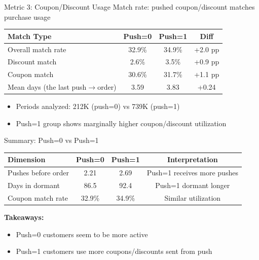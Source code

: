 \documentclass[aspectratio=169]{beamer}  %
\begin{document}
\begin{frame}{Metric 3: Coupon/Discount Usage}
Match rate: pushed coupon/discount matches purchase usage
\vspace{0.2cm}

\begin{table}
\centering
\small
\begin{tabular}{lccc}
\toprule
\textbf{Match Type} & \textbf{Push=0} & \textbf{Push=1} & \textbf{Diff} \\
\midrule
Overall match rate & 32.9\% & 34.9\% & +2.0 pp \\
Discount match & 2.6\% & 3.5\% & +0.9 pp \\
Coupon match & 30.6\% & 31.7\% & +1.1 pp \\
Mean days (the last push$\to$order) & 3.59 & 3.83 & +0.24 \\
\bottomrule
\end{tabular}
\end{table}

\begin{itemize}
    \item Periods analyzed: 212K (push=0) vs 739K (push=1)
    \item Push=1 group shows marginally higher coupon/discount utilization
\end{itemize}
\end{frame}

\begin{frame}{Summary: Push=0 vs Push=1}
\begin{table}
\centering
\small
\begin{tabular}{lccc}
\toprule
\textbf{Dimension} & \textbf{Push=0} & \textbf{Push=1} & \textbf{Interpretation} \\
\midrule
Pushes before order & 2.21 & 2.69 & Push=1 receives more pushes \\
Days in dormant & 86.5 & 92.4 & Push=1 dormant longer \\
Coupon match rate & 32.9\% & 34.9\% & Similar utilization \\
\bottomrule
\end{tabular}
\end{table}

\vspace{0.3cm}
\textbf{Takeaways:}
\begin{itemize}
    \item Push=0 customers seem to be more active
    \item Push=1 customers use more coupons/discounts sent from push
\end{itemize}
\end{frame}
\end{document}
